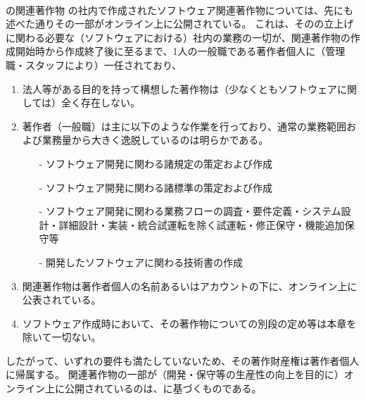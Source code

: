 \clearpage
~\vfill
\begin{Column}{\DMname の関連著作物}
\DMname の社内で作成されたソフトウェア関連著作物については、先にも述べた通りその一部がオンライン上に公開されている。
これは、その\DMname の立上げに関わる必要な（ソフトウェアにおける）社内の業務の一切が、関連著作物の作成開始時から作成終了後に至るまで、1人の一般職である著作者個人に（管理職・スタッフにより）一任されており、
\begin{enumerate}[label=\Roman*]
\item 法人等がある目的を持って構想した著作物は（少なくともソフトウェアに関しては）全く存在しない。
\item
著作者（一般職）は主に以下のような作業を行っており、通常の業務範囲および業務量から大きく逸脱しているのは明らかである。
  \begin{enumerate}
  \item[-] ソフトウェア開発に関わる諸規定の策定および作成
  \item[-] ソフトウェア開発に関わる諸標準の策定および作成
  \item[-] ソフトウェア開発に関わる業務フローの調査・要件定義・システム設計・詳細設計・実装・統合試運転を除く試運転・修正保守・機能追加保守等
  \item[-] 開発したソフトウェアに関わる技術書の作成
  \end{enumerate}
\item 関連著作物は著作者個人の名前あるいはアカウントの下に、オンライン上に公表されている。
\item ソフトウェア作成時において、その著作物についての別段の定め等は本章を除いて一切ない。
\end{enumerate}
したがって、いずれの要件も満たしていないため、その著作財産権は著作者個人に帰属する。
関連著作物の一部が（開発・保守等の生産性の向上を目的に）オンライン上に公開されているのは、に基づくものである。
\end{Column}

